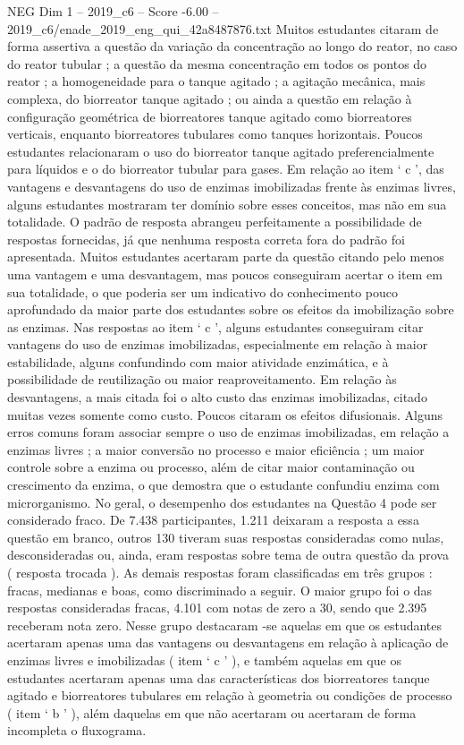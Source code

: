 \begin{textsample}{NEG Dim 1 – 2019\_c6 – Score -6.00 – 2019\_c6/enade\_2019\_eng\_qui\_42a8487876.txt}
Muitos estudantes citaram de forma assertiva a questão da variação da concentração ao longo do reator, no caso do reator tubular ; a questão da mesma concentração em todos os pontos do reator ; a homogeneidade para o tanque agitado ; a agitação mecânica, mais complexa, do biorreator tanque agitado ; ou ainda a questão em relação à configuração geométrica de biorreatores tanque agitado como biorreatores verticais, enquanto biorreatores tubulares como tanques horizontais.
Poucos estudantes relacionaram o uso do biorreator tanque agitado preferencialmente para líquidos e o do biorreator tubular para gases.
Em relação ao item ‘ c ’, das vantagens e desvantagens do uso de enzimas imobilizadas frente às enzimas livres, alguns estudantes mostraram ter domínio sobre esses conceitos, mas não em sua totalidade.
O padrão de resposta abrangeu perfeitamente a possibilidade de respostas fornecidas, já que nenhuma resposta correta fora do padrão foi apresentada.
Muitos estudantes acertaram parte da questão citando pelo menos uma vantagem e uma desvantagem, mas poucos conseguiram acertar o item em sua totalidade, o que poderia ser um indicativo do conhecimento pouco aprofundado da maior parte dos estudantes sobre os efeitos da imobilização sobre as enzimas.
Nas respostas ao item ‘ c ’, alguns estudantes conseguiram citar vantagens do uso de enzimas imobilizadas, especialmente em relação à maior estabilidade, alguns confundindo com maior atividade enzimática, e à possibilidade de reutilização ou maior reaproveitamento.
Em relação às desvantagens, a mais citada foi o alto custo das enzimas imobilizadas, citado muitas vezes somente como custo.
Poucos citaram os efeitos difusionais.
Alguns erros comuns foram associar sempre o uso de enzimas imobilizadas, em relação a enzimas livres ; a maior conversão no processo e maior eficiência ; um maior controle sobre a enzima ou processo, além de citar maior contaminação ou crescimento da enzima, o que demostra que o estudante confundiu enzima com microrganismo.
No geral, o desempenho dos estudantes na Questão 4 pode ser considerado fraco.
De 7.438 participantes, 1.211 deixaram a resposta a essa questão em branco, outros 130 tiveram suas respostas consideradas como nulas, desconsideradas ou, ainda, eram respostas sobre tema de outra questão da prova ( resposta trocada ).
As demais respostas foram classificadas em três grupos : fracas, medianas e boas, como discriminado a seguir.
O maior grupo foi o das respostas consideradas fracas, 4.101 com notas de zero a 30, sendo que 2.395 receberam nota zero.
Nesse grupo destacaram -se aquelas em que os estudantes acertaram apenas uma das vantagens ou desvantagens em relação à aplicação de enzimas livres e imobilizadas ( item ‘ c ’ ), e também aquelas em que os estudantes acertaram apenas uma das características dos biorreatores tanque agitado e biorreatores tubulares em relação à geometria ou condições de processo ( item ‘ b ’ ), além daquelas em que não acertaram ou acertaram de forma incompleta o fluxograma.

\end{textsample}
